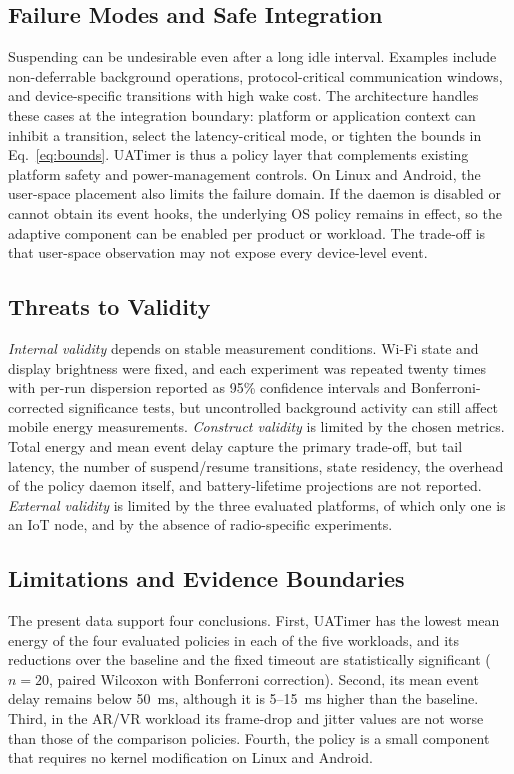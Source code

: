 \documentclass[journal]{IEEEtran}
\begin{document}
\subsection{Failure Modes and Safe Integration}
Suspending can be undesirable even after a long idle interval. Examples include non-deferrable background operations, protocol-critical communication windows, and device-specific transitions with high wake cost. The architecture handles these cases at the integration boundary: platform or application context can inhibit a transition, select the latency-critical mode, or tighten the bounds in Eq.~\eqref{eq:bounds}. UATimer is thus a policy layer that complements existing platform safety and power-management controls. On Linux and Android, the user-space placement also limits the failure domain. If the daemon is disabled or cannot obtain its event hooks, the underlying OS policy remains in effect, so the adaptive component can be enabled per product or workload. The trade-off is that user-space observation may not expose every device-level event.

\subsection{Threats to Validity}
\emph{Internal validity} depends on stable measurement conditions. Wi-Fi state and display brightness were fixed, and each experiment was repeated twenty times with per-run dispersion reported as 95\% confidence intervals and Bonferroni-corrected significance tests, but uncontrolled background activity can still affect mobile energy measurements. \emph{Construct validity} is limited by the chosen metrics. Total energy and mean event delay capture the primary trade-off, but tail latency, the number of suspend/resume transitions, state residency, the overhead of the policy daemon itself, and battery-lifetime projections are not reported. \emph{External validity} is limited by the three evaluated platforms, of which only one is an IoT node, and by the absence of radio-specific experiments.

\subsection{Limitations and Evidence Boundaries}
The present data support four conclusions. First, UATimer has the lowest mean energy of the four evaluated policies in each of the five workloads, and its reductions over the baseline and the fixed timeout are statistically significant ($n=20$, paired Wilcoxon with Bonferroni correction). Second, its mean event delay remains below 50~ms, although it is 5--15~ms higher than the baseline. Third, in the AR/VR workload its frame-drop and jitter values are not worse than those of the comparison policies. Fourth, the policy is a small component that requires no kernel modification on Linux and Android.
\end{document}

